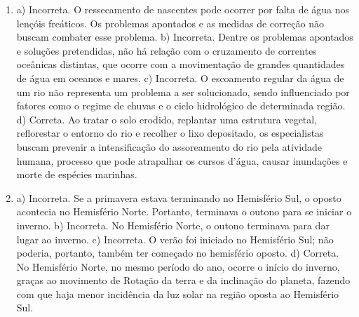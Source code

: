 \begin{enumerate}
\item
a) Incorreta. O ressecamento de nascentes pode ocorrer por falta de água
nos lençóis freáticos. Os problemas apontados e as medidas de correção
não buscam combater esse problema.
b) Incorreta. Dentre os problemas apontados e soluções pretendidas, não
há relação com o cruzamento de correntes oceânicas distintas, que ocorre
com a movimentação de grandes quantidades de água em oceanos e mares.
c) Incorreta. O escoamento regular da água de um rio não representa um
problema a ser solucionado, sendo influenciado por fatores como o regime
de chuvas e o ciclo hidrológico de determinada região.
d) Correta. Ao tratar o solo erodido, replantar uma estrutura vegetal,
reflorestar o entorno do rio e recolher o lixo depositado, os
especialistas buscam prevenir a intensificação do assoreamento do rio
pela atividade humana, processo que pode atrapalhar os cursos d'água,
causar inundações e morte de espécies marinhas.

\item
a) Incorreta. Se a primavera estava terminando no Hemisfério Sul, o
oposto acontecia no Hemisfério Norte. Portanto, terminava o outono para
se iniciar o inverno.
b) Incorreta. No Hemisfério Norte, o outono terminava para dar lugar ao
inverno.
c) Incorreta. O verão foi iniciado no Hemisfério Sul; não poderia, portanto, também ter começado no hemisfério oposto.
d) Correta. No Hemisfério Norte, no mesmo período do ano, ocorre o início
do inverno, graças ao movimento de Rotação da terra e da inclinação do
planeta, fazendo com que haja menor incidência da luz solar na região
oposta ao Hemisfério Sul.
\end{enumerate}


